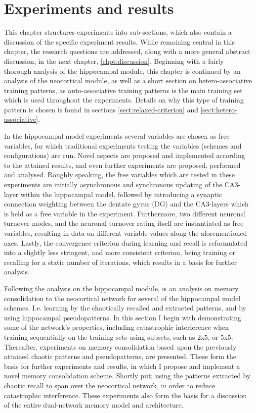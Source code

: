 
\chapter{Experiments and results}\label{chpt:experiments}

This chapter structures experiments into sub-sections, which also contain a discussion of the specific experiment results. While remaining central in this chapter, the research questions are addressed, along with a more general abstract discussion, in the next chapter, \ref{chpt:discussion}.
Beginning with a fairly thorough analysis of the hippocampal module, this chapter is continued by an analysis of the neocortical module, as well as a short section on hetero-associative training patterns, as auto-associative training patterns is the main training set which is used throughout the experiments. Details on why this type of training pattern is chosen is found in sections \ref{sect:relaxed-criterion} and \ref{sect:hetero-associative}. 

In the hippocampal model experiments several variables are chosen as free variables, for which traditional experiments testing the variables (schemes and configurations) are run. Novel aspects are proposed and implemented according to the attained results, and even further experiments are proposed, performed and analysed.
Roughly speaking, the free variables which are tested in these experiments are initially asynchronous and synchronous updating of the CA3-layer within the hippocampal model, followed by introducing a synaptic connection weighting between the dentate gyrus (DG) and the CA3-layers which is held as a free variable in the experiment. Furthermore, two different neuronal turnover modes, and the neuronal turnover rating itself are instantiated as free variables, resulting in data on different variable values along the aforementioned axes. Lastly, the convergence criterion during learning and recall is reformulated into a slightly less stringent, and more consistent criterion, being training or recalling for a static number of iterations, which results in a basis for further analysis.

Following the analysis on the hippocampal module, is an analysis on memory consolidation to the neocortical network for several of the hippocampal model schemes. I.e. learning by the chaotically recalled and extracted patterns, and by using hippocampal pseudopatterns.
In this section I begin with demonstrating some of the network's properties, including catastrophic interference when training sequentially on the training sets using subsets, such as 2x5, or 5x5. Thereafter, experiments on memory consolidation based upon the previously attained chaotic patterns and pseudopatterns, are presented. These form the basis for further experiments and results, in which I propose and implement a novel memory consolidation scheme. Shortly put; using the patterns extracted by chaotic recall to span over the neocortical network, in order to reduce catastrophic interference. These experiments also form the basis for a discussion of the entire dual-network memory model and architecture.


